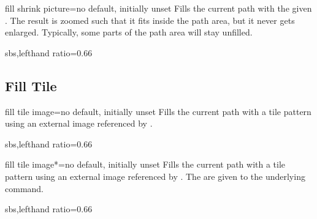 \begin{docTikzKey}{fill shrink picture}{=}{no default, initially unset}
  Fills the current path with the given .
  The result is zoomed such that it fits inside the path area, but it never
  gets enlarged.
  Typically, some parts of the path area will stay unfilled.
\begin{dispExample*}{sbs,lefthand ratio=0.66}
\end{dispExample*}
\end{docTikzKey}


\clearpage
\subsection{Fill Tile}
\begin{docTikzKey}{fill tile image}{=}{no default, initially unset}
  Fills the current path with a tile pattern using an external image referenced by .
\begin{dispExample*}{sbs,lefthand ratio=0.66}
\end{dispExample*}
\end{docTikzKey}


\begin{docTikzKey}{fill tile image*}{=}{no default, initially unset}
  Fills the current path with a tile pattern using an external image referenced by .
  The  are given to the underlying  command.
\begin{dispExample*}{sbs,lefthand ratio=0.66}
\end{dispExample*}
\end{docTikzKey}

